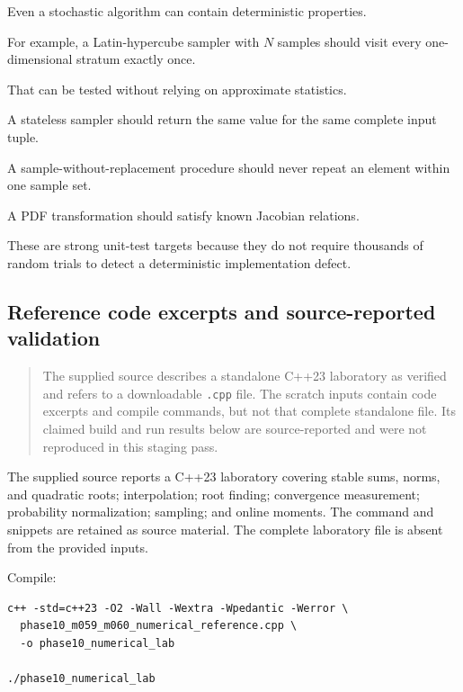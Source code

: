\hypertarget{02-foundations-ii-ch031-deterministic-tests-of-randomized-code}{}

Even a stochastic algorithm can contain deterministic properties.

For example, a Latin-hypercube sampler with \(N\) samples should visit every one-dimensional stratum exactly once.

That can be tested without relying on approximate statistics.

A stateless sampler should return the same value for the same complete input tuple.

A sample-without-replacement procedure should never repeat an element within one sample set.

A PDF transformation should satisfy known Jacobian relations.

These are strong unit-test targets because they do not require thousands of random trials to detect a deterministic implementation defect.

\subsection{Reference code excerpts and source-reported validation}\label{02-foundations-ii-ch031-reference-code-excerpts-and-source-reported-validation}

\hypertarget{02-foundations-ii-ch031-reference-code-excerpts-and-source-reported-validation}{}

\begin{quote}
The supplied source describes a standalone C++23 laboratory as verified and refers to a downloadable \texttt{.cpp} file. The scratch inputs contain code excerpts and compile commands, but not that complete standalone file. Its claimed build and run results below are source-reported and were not reproduced in this staging pass.
\end{quote}

The supplied source reports a C++23 laboratory covering stable sums, norms, and quadratic roots; interpolation; root finding; convergence measurement; probability normalization; sampling; and online moments. The command and snippets are retained as source material. The complete laboratory file is absent from the provided inputs.

Compile:

\begin{verbatim}
c++ -std=c++23 -O2 -Wall -Wextra -Wpedantic -Werror \
  phase10_m059_m060_numerical_reference.cpp \
  -o phase10_numerical_lab

./phase10_numerical_lab
\end{verbatim}

